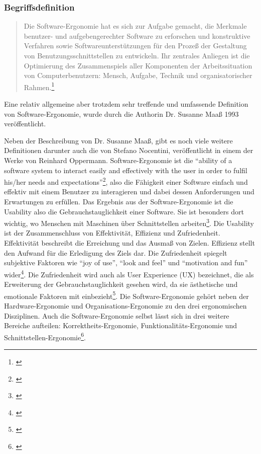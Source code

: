 
\subsubsection{Begriffsdefinition}
\begin{quote}
    Die Software-Ergonomie hat es sich zur Aufgabe gemacht, die Merkmale benutzer- und aufgebengerechter Software zu erforschen und konstruktive Verfahren sowie Softwareunterstützungen für den Prozeß der Gestaltung von Benutzungsschnittstellen zu entwickeln. Ihr zentrales Anliegen ist die Optimierung des Zusammenspiels aller Komponenten der Arbeitssituation von Computerbenutzern: Mensch, Aufgabe, Technik und organisatorischer Rahmen.\footnote{\cite{Maass1993}}
\end{quote}
Eine relativ allgemeine aber trotzdem sehr treffende und umfassende Definition von Software-Ergonomie, wurde durch die Authorin Dr. Susanne Maaß 1993 veröffentlicht. 

Neben der Beschreibung von Dr. Susanne Maaß, gibt es noch viele weitere Definitionen darunter auch die von Stefano Nocentini, veröffentlicht in einem der Werke von Reinhard Oppermann. Software-Ergonomie ist die \enquote{ability of a software system to interact easily and effectively with the user in order to fulfil his/her needs and expectations}\footnote{\cite[4]{Oppermann1988einfuehrung}}, also die Fähigkeit einer Software einfach und effektiv mit einem Benutzer zu interagieren und dabei dessen Anforderungen und Erwartungen zu erfüllen. Das Ergebnis aus der Software-Ergonomie ist die Usability also die Gebrauchstauglichkeit einer Software. Sie ist besonders dort wichtig, wo Menschen mit Maschinen über Schnittstellen arbeiten\footnote{\cite[vgl.][]{usabilityDe}}. Die Usability ist der Zusammenschluss von Effektivität, Effizienz und Zufriedenheit. Effektivität beschreibt die Erreichung und das Ausmaß von Zielen. Effizienz stellt den Aufwand für die Erledigung des Ziels dar. Die Zufriedenheit spiegelt subjektive Faktoren wie \enquote{joy of use}, \enquote{look and feel} und \enquote{motivation and fun} wider\footnote{\cite[vgl.][]{Holzinger2011human}}. Die Zufriedenheit wird auch als User Experience (UX) bezeichnet, die als Erweiterung der Gebrauchstauglichkeit gesehen wird, da sie ästhetische und emotionale Faktoren mit einbezieht\footnote{\cite[vgl.][]{usabilityDe}}. Die Software-Ergonomie gehört neben der Hardware-Ergonomie und Organisations-Ergonomie zu den drei ergonomischen Disziplinen. Auch die Software-Ergonomie selbst lässt sich in drei weitere Bereiche aufteilen: Korrektheits-Ergonomie, Funktionalitäts-Ergonomie und Schnittstellen-Ergonomie\footnote{\cite[vgl.][]{Oppermann1988einfuehrung}}.


